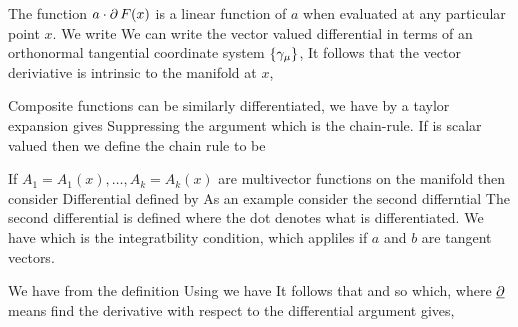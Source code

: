 The function $a\cdot \operatorname{\partial} F(x)$ is a linear function of $a$ when evaluated
at any particular point $x$.
We write
We can write the vector valued differential in terms of an orthonormal tangential
coordinate system $\{\gamma_\mu\}$,
It follows that the vector deriviative is intrinsic to the
manifold at $x$,

Composite functions can be similarly differentiated,
we have by a taylor expansion
gives
Suppressing the argument
which is the chain-rule.
If
is scalar valued then we define the chain rule to be 

If $A_1 = A_1(x), \ldots, A_k = A_k(x)$ are multivector functions on
the manifold then consider
Differential defined by
As an example consider the second differntial
The second differential is defined
where the dot denotes what is differentiated.
We have
which is the integratbility condition,
which appliles if $a$ and $b$ are tangent vectors.

We have from the definition
Using  we have
It follows that 
and so
which, where $\underline{\operatorname{\partial}}$ means find the derivative with respect to the
differential argument gives,

